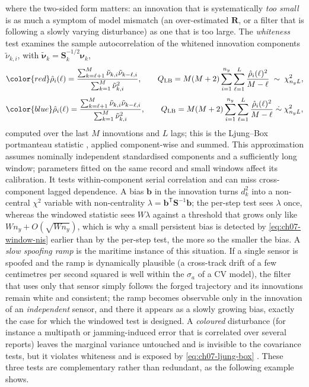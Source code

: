\documentclass[graybox,envcountchap]{style/SNmono}
\providecommand{\DIFadd}[1]{{\protect\color{blue} #1}} %
\providecommand{\DIFdel}[1]{{\protect\color{red} #1}} %
\providecommand{\DIFaddbegin}{} %
\providecommand{\DIFaddend}{} %
\providecommand{\DIFdelbegin}{} %
\providecommand{\DIFdelend}{} %
\begin{document}
where the two-sided form matters: an innovation that is systematically \emph{too small} is as much a symptom of model mismatch (an over-estimated $\mathbf{R}$, or a filter that is following a slowly varying disturbance) as one that is too large. The \emph{whiteness} test examines the sample autocorrelation of the whitened innovation components $\tilde{\nu}_{k,i}$, with $\tilde{\boldsymbol{\nu}}_k=\mathbf{S}_k^{-1/2}\boldsymbol{\nu}_k$,
\DIFdelbegin \begin{displaymath}
\DIFdel{\hat\rho_{i}(\ell)=\frac{\sum_{k=\ell+1}^{M}\tilde{\nu}_{k,i}\tilde{\nu}_{k-\ell,i}}{\sum_{k=1}^{M}\tilde{\nu}_{k,i}^{2}},
\qquad
Q_{\mathrm{LB}}=M(M+2)\sum_{i=1}^{n_y}\sum_{\ell=1}^{L}\frac{\hat\rho_{i}(\ell)^{2}}{M-\ell}\;\sim\;\chi^{2}_{n_y L},
}\end{displaymath}%
\DIFdelend \DIFaddbegin \begin{equation}
\DIFadd{\hat\rho_{i}(\ell)=\frac{\sum_{k=\ell+1}^{M}\tilde{\nu}_{k,i}\tilde{\nu}_{k-\ell,i}}{\sum_{k=1}^{M}\tilde{\nu}_{k,i}^{2}},
\qquad
Q_{\mathrm{LB}}=M(M+2)\sum_{i=1}^{n_y}\sum_{\ell=1}^{L}\frac{\hat\rho_{i}(\ell)^{2}}{M-\ell}\;\dot\sim\;\chi^{2}_{n_y L},
\label{eq:ch07-ljung-box}
}\end{equation}\DIFaddend 
computed over the last $M$ innovations and $L$ lags; this is the Ljung--Box portmanteau statistic \cite{ljung_box_1978}, applied component-wise and summed. \DIFaddbegin \DIFadd{This approximation assumes nominally independent standardised components and a sufficiently long window; parameters fitted on the same record and small windows affect its calibration. It tests within-component serial correlation and can miss cross-component lagged dependence. }\DIFaddend A bias $\mathbf{b}$ in the innovation turns $d_k^{2}$ into a non-central $\chi^{2}$ variable with non-centrality $\lambda=\mathbf{b}^{\mathsf T}\mathbf{S}^{-1}\mathbf{b}$; the per-step test sees $\lambda$ once, whereas the windowed statistic sees $W\lambda$ against a threshold that grows only like $W n_y+O(\sqrt{W n_y})$, which is why a small persistent bias is detected by \eqref{eq:ch07-window-nis} earlier than by the per-step test, the more so the smaller the bias. A \emph{slow spoofing ramp} is the maritime instance of this situation. If a single sensor is spoofed and the ramp is dynamically plausible (a cross-track drift of a few centimetres per second squared is well within the $\sigma_a$ of a CV model), the filter that uses only that sensor simply follows the forged trajectory and its innovations remain white and consistent; the ramp becomes observable only in the innovation of an \emph{independent} sensor, and there it appears as a slowly growing bias, exactly the case for which the windowed test is designed. A \emph{coloured} disturbance (for instance a multipath or jamming-induced error that is correlated over several reports) leaves the marginal variance untouched and is invisible to the covariance tests, but it violates whiteness and is exposed by \eqref{eq:ch07-ljung-box} \cite{oliva_innovation_2026}. These three tests are complementary rather than redundant, as the following example shows.
\end{document}
